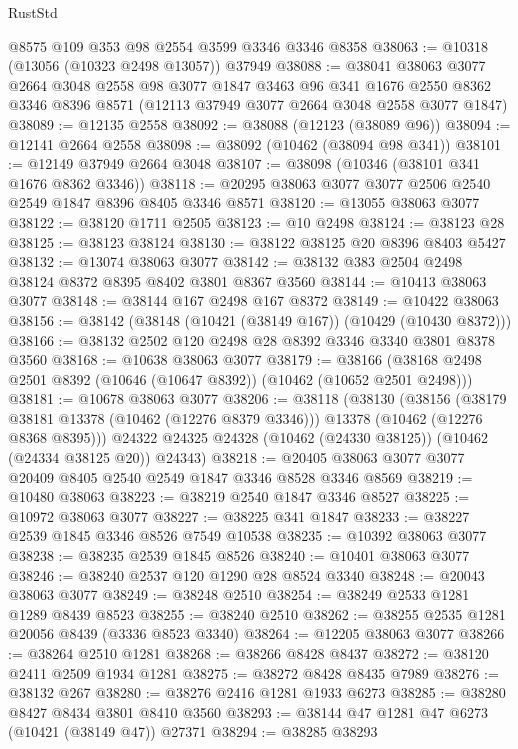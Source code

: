 \begin{lexlean}{RustStd}
\begin{coremodule}
    @8575
    @109
    @353
    @98
    @2554
    @3599
    @3346
    @3346
    @8358
@38063 := @10318 (@13056 (@10323 @2498 @13057)) @37949
@38088 := @38041
    @38063
    @3077
    @2664
    @3048
    @2558
    @98
    @3077
    @1847
    @3463
    @96
    @341
    @1676
    @2550
    @8362
    @3346
    @8396
    @8571
    (@12113 @37949 @3077 @2664 @3048 @2558 @3077 @1847)
@38089 := @12135 @2558
@38092 := @38088 (@12123 (@38089 @96))
@38094 := @12141 @2664 @2558
@38098 := @38092 (@10462 (@38094 @98 @341))
@38101 := @12149 @37949 @2664 @3048
@38107 := @38098 (@10346 (@38101 @341 @1676 @8362 @3346))
@38118 := @20295 @38063 @3077 @3077 @2506 @2540 @2549 @1847 @8396 @8405 @3346 @8571
@38120 := @13055 @38063 @3077
@38122 := @38120 @1711 @2505
@38123 := @10 @2498
@38124 := @38123 @28
@38125 := @38123 @38124
@38130 := @38122 @38125 @20 @8396 @8403 @5427
@38132 := @13074 @38063 @3077
@38142 := @38132 @383 @2504 @2498 @38124 @8372 @8395 @8402 @3801 @8367 @3560
@38144 := @10413 @38063 @3077
@38148 := @38144 @167 @2498 @167 @8372
@38149 := @10422 @38063
@38156 := @38142 (@38148 (@10421 (@38149 @167)) (@10429 (@10430 @8372)))
@38166 := @38132 @2502 @120 @2498 @28 @8392 @3346 @3340 @3801 @8378 @3560
@38168 := @10638 @38063 @3077
@38179 := @38166 (@38168 @2498 @2501 @8392 (@10646 (@10647 @8392)) (@10462 (@10652 @2501 @2498)))
@38181 := @10678 @38063 @3077
@38206 := @38118
    (@38130
      (@38156
        (@38179 @38181 @13378 (@10462 (@12276 @8379 @3346)))
        @13378
        (@10462 (@12276 @8368 @8395)))
      @24322
      @24325
      @24328
      (@10462 (@24330 @38125))
      (@10462 (@24334 @38125 @20))
      @24343)
@38218 := @20405 @38063 @3077 @3077 @20409 @8405 @2540 @2549 @1847 @3346 @8528 @3346 @8569
@38219 := @10480 @38063
@38223 := @38219 @2540 @1847 @3346 @8527
@38225 := @10972 @38063 @3077
@38227 := @38225 @341 @1847
@38233 := @38227 @2539 @1845 @3346 @8526 @7549 @10538
@38235 := @10392 @38063 @3077
@38238 := @38235 @2539 @1845 @8526
@38240 := @10401 @38063 @3077
@38246 := @38240 @2537 @120 @1290 @28 @8524 @3340
@38248 := @20043 @38063 @3077
@38249 := @38248 @2510
@38254 := @38249 @2533 @1281 @1289 @8439 @8523
@38255 := @38240 @2510
@38262 := @38255 @2535 @1281 @20056 @8439 (@3336 @8523 @3340)
@38264 := @12205 @38063 @3077
@38266 := @38264 @2510 @1281
@38268 := @38266 @8428 @8437
@38272 := @38120 @2411 @2509 @1934 @1281
@38275 := @38272 @8428 @8435 @7989
@38276 := @38132 @267
@38280 := @38276 @2416 @1281 @1933 @6273
@38285 := @38280 @8427 @8434 @3801 @8410 @3560
@38293 := @38144 @47 @1281 @47 @6273 (@10421 (@38149 @47)) @27371
@38294 := @38285 @38293

\end{coremodule}
\end{lexlean}
